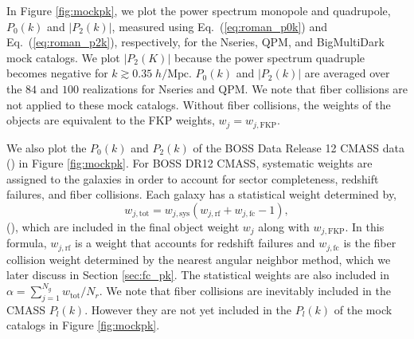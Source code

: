 In Figure \ref{fig:mockpk}, we plot the  power spectrum monopole and quadrupole, ${P_0(k)}$ 
and $|{P_2(k)}|$, measured using Eq.~(\ref{eq:roman_p0k}) and Eq.~(\ref{eq:roman_p2k}), respectively, for the Nseries, QPM, and BigMultiDark 
mock catalogs. We plot $|{P_2(K)}|$ because the power spectrum quadruple 
becomes negative for $k \gtrsim 0.35\;h/\mathrm{Mpc}$. ${P_0(k)}$ and
$|{P_2(k)}|$ are averaged over the $84$ and $100$ realizations for
Nseries and QPM. We note that fiber collisions are not applied to these mock 
catalogs. Without fiber collisions, the weights of the objects are equivalent 
to the FKP weights, $w_j = w_{j,\mathrm{FKP}}$. 

We also plot the $P_0(k)$ and $P_2(k)$ of the BOSS Data Release 12 CMASS 
data (\cmasscolor) in Figure \ref{fig:mockpk}. For BOSS DR12 CMASS, 
systematic weights are assigned to the galaxies in order to account for 
sector completeness, redshift failures, and fiber collisions. Each galaxy 
has a statistical weight determined by, 
\begin{equation} \label{eq:weight}
w_{j, \mathrm{tot}} = w_{j, \mathrm{sys}} (w_{j, \mathrm{rf}} + w_{j, \mathrm{fc}} -1), 
\end{equation} 
(\citealt{Anderson:2012aa, Ross:2012aa, Beutler:2014aa}), which are included in the 
final object weight $w_j$ along with $w_{j, \mathrm{FKP}}$. In this formula, $w_{j,\mathrm{rf}}$ is a weight that accounts for redshift failures and $w_{j,\mathrm{fc}}$
is the fiber collision weight determined by the nearest angular neighbor method, which we
later discuss in Section \ref{sec:fc_pk}. The statistical 
weights are also included in $\alpha = \sum_{j=1}^{N_g} w_\mathrm{tot} / N_r$. 
We note that fiber collisions are inevitably included in the CMASS $P_l(k)$.
However they are not yet included in the $P_l(k)$ of the mock catalogs in Figure \ref{fig:mockpk}.

